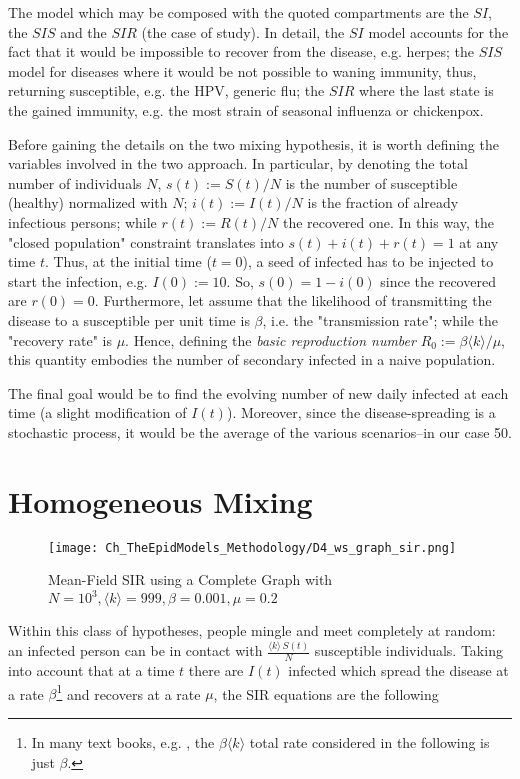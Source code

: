\documentclass[a4paper,10pt,twoside]{book} %
\theoremstyle{definition}
\begin{document}
The model which may be composed with the quoted compartments are the $SI$, the $SIS$ and the $SIR$ (the case of study). In detail, the $SI$ model accounts for the fact that it would be impossible to recover from the disease, e.g. herpes; the $SIS$ model for diseases where it would be not possible to waning immunity, thus, returning susceptible, e.g. the HPV, generic flu; the $SIR$ where the last state is the gained immunity, e.g. the most strain of seasonal influenza or chickenpox.

Before gaining the details on the two mixing hypothesis, it is worth defining the variables involved in the two approach.
In particular, by denoting the total number of individuals $N$, $s(t) := S(t)/N$ is the number of susceptible (healthy) normalized with $N$; $i(t):=I(t)/N$ is the fraction of already infectious persons; while $r(t) := R(t)/N$ the recovered one. In this way, the "closed population" constraint translates into $s(t)+i(t)+r(t)=1$ at any time $t$. 
Thus, at the initial time ($t = 0$), a seed of infected has to be injected to start the infection, e.g. $I(0) := 10$. So, $s(0) = 1 - i(0)$ since the recovered are $r(0) = 0$.
Furthermore, let assume that the likelihood of transmitting the disease to a susceptible per unit time is $\beta$, i.e. the "transmission rate"; while the "recovery rate" is $\mu$. Hence, defining the \textit{basic reproduction number}  $R_0 := \beta \langle k \rangle / \mu$, this quantity embodies the number of secondary infected in a naive population.

The final goal would be to find the evolving number of new daily infected at each time (a slight modification of $I(t)$). Moreover, since the disease-spreading is a stochastic process, it would be the average of the various scenarios--in our case 50.

\newpage
\section{Homogeneous Mixing}

\begin{figure}[ht]
	\texttt{[image: Ch\_TheEpidModels\_Methodology/D4\_ws\_graph\_sir.png]}
	\caption{Mean-Field SIR using a Complete Graph with $N = 10^{3}, \langle k \rangle = 999, \beta = 0.001,  \mu = 0.2$}
	\label{fig:MF_SIR}
\end{figure}

Within this class of hypotheses, people mingle and meet completely at random: an infected person can be in contact with {\large $\frac{\langle k \rangle \, S(t)}{N}$} susceptible individuals. Taking into account that at a time $t$ there are $I(t)$ infected which spread the disease at a rate $\beta$\footnote{In many text books, e.g. \cite{Newman:2010_Net:AnIntro}, the $\beta \langle k \rangle$ total rate considered in the following is just $\beta$.} and recovers at a rate $\mu$,
the SIR equations are the following \cite{Newman:2010_Net:AnIntro}
\end{document}
